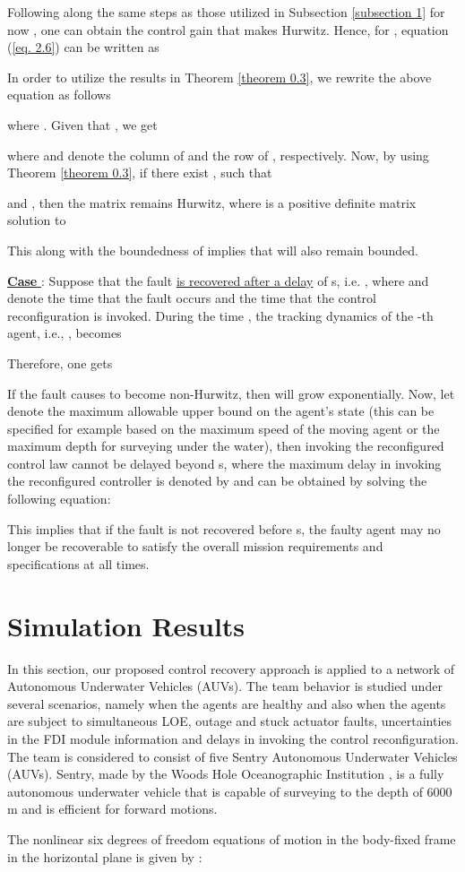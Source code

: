 \documentclass[12pt,draftcls,onecolumn]{IEEEtran}
\newcommand{\RNum}[1]{\uppercase\expandafter{\romannumeral #1\relax}}
\begin{document}
Following along the same steps as those utilized in Subsection \ref{subsection 1} for now  , one can obtain the control gain  that makes  Hurwitz. Hence, for , equation (\ref{eq. 2.6}) can be written as

In order to utilize the results in Theorem \ref{theorem 0.3}, we rewrite the above equation as follows

where . Given that , we get

where  and  denote the    column of  and the   row  of , respectively. Now, by using Theorem \ref{theorem 0.3}, if there exist ,  such that
 
 and ,  then  the matrix  remains Hurwitz, where  is a positive definite matrix solution to
  
This along with the boundedness of  implies that  will also remain bounded.\par
\underline{\textbf{Case \RNum{5}}}: Suppose that the fault \underline{is recovered after a delay} of  s, i.e. , where  and  denote the time that the fault occurs and the time that the control reconfiguration is invoked. During the time , the tracking dynamics  of the -th agent, i.e., , becomes

Therefore, one gets
\par
If the fault causes  to become non-Hurwitz, then  will grow exponentially. Now, let  denote the maximum allowable upper bound on the agent's state (this can be specified  for example based on the maximum speed of the moving agent or the maximum depth for surveying under the water), then invoking the reconfigured control law cannot be delayed beyond s, where the maximum delay in invoking the reconfigured controller is denoted by  and can be obtained by solving the following equation:
  
This implies that if the fault is not recovered before  s, the faulty agent may no longer be recoverable to satisfy the overall mission requirements and specifications at all times. 
\section{Simulation Results}\label{simulation results}
In this section, our proposed control recovery approach is applied to a network  of  Autonomous Underwater Vehicles (AUVs). The team behavior is studied under several  scenarios, namely when the  agents are healthy and also when the agents are subject to simultaneous LOE,  outage and stuck actuator faults, uncertainties in the FDI module information and delays in invoking the control reconfiguration.  The team is considered to  consist  of  five Sentry Autonomous Underwater Vehicles (AUVs). Sentry, made by the Woods Hole Oceanographic Institution \cite{jakuba2003}, is a fully autonomous underwater vehicle that is capable of surveying to the depth of 6000 m and is efficient for forward motions.   \par
The nonlinear six degrees of freedom equations of motion in the body-fixed frame in the horizontal plane is given by \cite{fossen94}:
\end{document}
